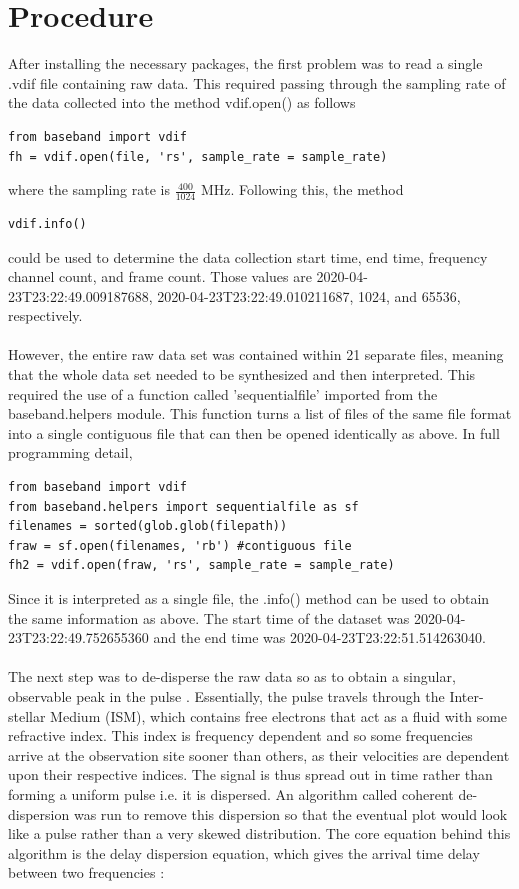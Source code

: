 \documentclass{article}
\begin{document}
\section{Procedure}
After installing the necessary packages, the first problem was to read a single .vdif file containing raw data. This required passing through the sampling rate of the data collected into the
method vdif.open() as follows
\begin{lstlisting}
from baseband import vdif
fh = vdif.open(file, 'rs', sample_rate = sample_rate)
\end{lstlisting}
where the sampling rate is $\tfrac{400}{1024} \text{ MHz}.$
Following this, the method
\begin{lstlisting}
vdif.info()
\end{lstlisting}
could be used to determine the data collection start time, end time, frequency channel count, and frame count. Those values are 2020-04-23T23:22:49.009187688, 2020-04-23T23:22:49.010211687, 1024, and 65536, respectively.\\
\\
However, the entire raw data set was contained within 21 separate files, meaning that the whole data set needed to be synthesized and then interpreted. This required the use of a function called 'sequentialfile' imported from the baseband.helpers module. This function turns a list of files of the same file format into a single contiguous file that can then be opened identically as above. In full programming detail,
\begin{lstlisting}
from baseband import vdif
from baseband.helpers import sequentialfile as sf
filenames = sorted(glob.glob(filepath))
fraw = sf.open(filenames, 'rb') #contiguous file
fh2 = vdif.open(fraw, 'rs', sample_rate = sample_rate)
\end{lstlisting}
Since it is interpreted as a single file, the .info() method can be used to obtain the same information as above. The start time of the dataset was 2020-04-23T23:22:49.752655360 and the end time was 2020-04-23T23:22:51.514263040.\\
\\
The next step was to de-disperse the raw data so as to obtain a singular, observable peak in the pulse \cite{2012hpa..book.....L}. Essentially, the pulse travels through the Inter-stellar Medium (ISM), which contains free electrons that act as a fluid with some refractive index. This index is frequency dependent and so some frequencies arrive at the observation site sooner than others, as their velocities are dependent upon their respective indices. The signal is thus spread out in time rather than forming a uniform pulse i.e. it is dispersed. An algorithm called coherent de-dispersion was run to remove this dispersion so that the eventual plot would look like a pulse rather than a very skewed distribution. The core equation behind this algorithm is the delay dispersion equation, which gives the arrival time delay between two frequencies \cite{2012hpa..book.....L}:
\end{document}
